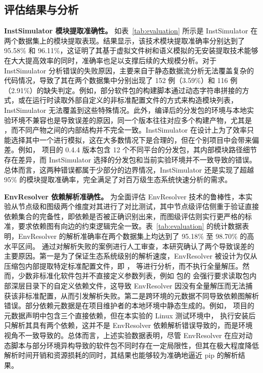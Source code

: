 \subsection{评估结果与分析}
\textbf{InstSimulator 模块提取准确性。}
如表~\ref{tab:evaluation} 所示是 InstSimulator 在两个数据集上的模块提取表现。结果显示，该技术模块提取准确率分别达到了 95.58\% 和 96.11\%，这证明了其基于虚拟文件树和语义模拟的无安装提取技术能够在大大提高效率的同时，准确率也足以支撑后续的大规模分析。对于 InstSimulator 分析错误的失败原因，主要来自于静态数据流分析无法覆盖复杂的代码情况，导致了其在两个数据集中分别出现了 152 例（3.59\%）和 116 例（2.91\%）的缺失判定。例如，部分软件包的构建脚本通过动态字符串拼接的方式，或在运行时读取外部自定义的非标准配置文件的方式来构造模块列表，InstSimulator 无法覆盖到这些特殊情况。此外，编译后的分发包的环境与本地实验环境不兼容也是导致误差的原因，同一个版本往往对应多个构建产物，尤其是 ，而不同产物之间的内部结构并不完全一致。InstSimulator 在设计上为了效率只能选择其中一个进行模拟，这在大多数情况下是合理的，但在个别项目中会带来偏差。例如， 项目的 0.4.4 版本包含 12 个不同平台的分发包，其内部模块路径细节存在差异，而 InstSimulator 选择的分发包和当前实验环境并不一致导致的错误。总体而言，这两种错误都属于少部分的边界情况，InstSimulator 还是实现了超越 95\% 的模块提取准确率，完全满足了对百万级生态系统快速分析的需求。

\textbf{EnvResolver 依赖解析准确性。}
为全面评估 EnvResolver 技术的鲁棒性，本实验从节点级和图级两个维度对其进行了对比测试，其中节点级评估侧重于验证直接依赖集合的完备性，即依赖是否被正确识别出来，而图级评估则实行更严格的标准，要求依赖图有向边的约束逻辑完全一致。表~\ref{tab:evaluation} 的统计数据表明，EnvResolver 的解析准确率在两个数据集上均达到了 95.18\% 至 98.70\% 的高水平区间。
通过对解析失败的案例进行人工审查，本研究确认了两个导致误差的主要原因。第一是为了保证生态系统级别的解析速度，EnvResolver 被设计为仅从压缩包内部提取特定标准配置文件，即 ， 等进行分析，而不执行全量解压。然而，少数非标准化软件包并不直接定义参数列表，例如  包的  会强行要求读取包内部深层目录下的自定义依赖文件，这导致 EnvResolver 因没有全量解压而无法捕获该非标准配置，从而引发解析失败。第二是跨环境的元数据不同导致依赖图解析错误。部分依赖元数据是在项目维护者的本地环境中静态生成的。例如， 项目的元数据声明中包含三个直接依赖，但在本实验的 Linux 测试环境中， 执行安装后只解析其具有两个依赖，这并不是 EnvResolver 依赖解析错误导致的，而是环境视角不一致导致的。总体而言，上述实验数据表明，尽管 EnvResolver 在应对动态脚本与部分环境异构导致的软件包不同时存在一定局限性，但其在极大程度降低解析时间开销和资源损耗的同时，其结果也能够较为准确地逼近 pip 的解析结果。

